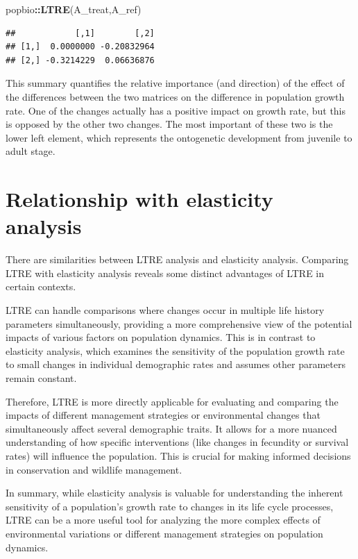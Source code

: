 \documentclass[
  a4paper]{book}
\newenvironment{Shaded}{\begin{snugshade}}{\end{snugshade}}
\newcommand{\FunctionTok}[1]{\textcolor[rgb]{0.13,0.29,0.53}{\textbf{#1}}}
\newcommand{\NormalTok}[1]{#1}
\newcommand{\SpecialCharTok}[1]{\textcolor[rgb]{0.81,0.36,0.00}{\textbf{#1}}}
\begin{document}
\begin{Shaded}
\begin{Highlighting}[]
\NormalTok{popbio}\SpecialCharTok{::}\FunctionTok{LTRE}\NormalTok{(A\_treat,A\_ref)}
\end{Highlighting}
\end{Shaded}

\begin{verbatim}
##            [,1]        [,2]
## [1,]  0.0000000 -0.20832964
## [2,] -0.3214229  0.06636876
\end{verbatim}

This summary quantifies the relative importance (and direction) of the effect of the differences between the two matrices on the difference in population growth rate.
One of the changes actually has a positive impact on growth rate, but this is opposed by the other two changes. The most important of these two is the lower left element, which represents the ontogenetic development from juvenile to adult stage.

\section{Relationship with elasticity analysis}\label{relationship-with-elasticity-analysis}

There are similarities between LTRE analysis and elasticity analysis. Comparing LTRE with elasticity analysis reveals some distinct advantages of LTRE in certain contexts.

LTRE can handle comparisons where changes occur in multiple life history parameters simultaneously, providing a more comprehensive view of the potential impacts of various factors on population dynamics. This is in contrast to elasticity analysis, which examines the sensitivity of the population growth rate to small changes in individual demographic rates and assumes other parameters remain constant.

Therefore, LTRE is more directly applicable for evaluating and comparing the impacts of different management strategies or environmental changes that simultaneously affect several demographic traits. It allows for a more nuanced understanding of how specific interventions (like changes in fecundity or survival rates) will influence the population. This is crucial for making informed decisions in conservation and wildlife management.

In summary, while elasticity analysis is valuable for understanding the inherent sensitivity of a population's growth rate to changes in its life cycle processes, LTRE can be a more useful tool for analyzing the more complex effects of environmental variations or different management strategies on population dynamics.
\end{document}
